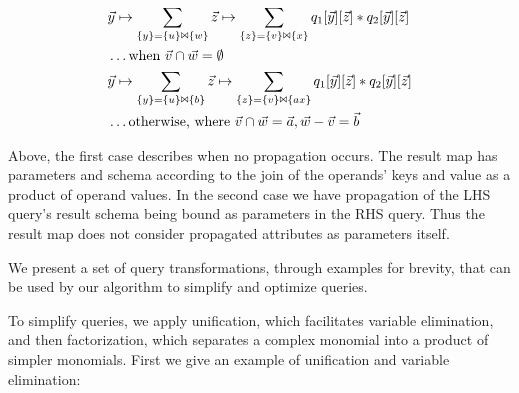{{\vspace{-4mm}
\begin{align*}
& \vec{y} \mapsto
\sum_{\{y\} = \{u\} \Join \{w\}} 
\vec{z} \mapsto
  \sum_{\{z\} = \{v\} \Join \{x\}}
  q_1[\vec{y}][\vec{z}] * q_2[\vec{y}][\vec{z}]
\\
& \ldots \mbox{when $\vec{v} \cap \vec{w} = \emptyset$}
\\
& \vec{y} \mapsto
\sum_{\{y\} = \{u\} \Join \{b\}} 
\vec{z} \mapsto
  \sum_{\{z\} = \{v\} \Join \{ax\}}
  q_1[\vec{y}][\vec{z}] * q_2[\vec{y}][\vec{z}]
\\
& \ldots \mbox{otherwise, where $\vec{v} \cap \vec{w} = \vec{a}, 
\vec{w} - \vec{v} = \vec{b}$}
\end{align*}

Above, the first case describes when no propagation occurs. The result map has
parameters and schema according to the join of the operands' keys and value as a
product of operand values. In the second case we have propagation of the LHS
query's result schema being bound as parameters in the RHS query. Thus the
result map does not consider propagated attributes as parameters itself.
}


\vspace{0.5mm}
We present a set of query transformations, through examples for brevity, that
can be used by our algorithm to simplify and optimize queries.

To simplify queries, we apply unification, which facilitates variable
elimination, and then factorization, which separates a complex monomial into a
product of simpler monomials. First we give an example of unification and
variable elimination: 

}
